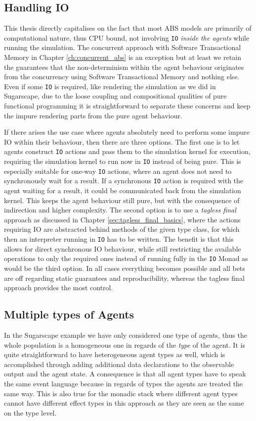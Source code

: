 \subsection{Handling IO}
This thesis directly capitalises on the fact that most ABS models are primarily of computational nature, thus CPU bound, not involving \texttt{IO} \textit{inside the agents} while running the simulation. The concurrent approach with Software Transactional Memory in Chapter \ref{ch:concurrent_abs} is an exception but at least we retain the guarantees that the non-determinism within the agent behaviour originates from the concurrency using Software Transactional Memory and nothing else. Even if some \texttt{IO} is required, like rendering the simulation as we did in Sugarscape, due to the loose coupling and compositional qualities of pure functional programming it is straightforward to separate these concerns and keep the impure rendering parts from the pure agent behaviour.

If there arises the use case where agents absolutely need to perform some impure IO within their behaviour, then there are three options. The first one is to let agents construct \texttt{IO} actions and pass them to the simulation kernel for execution, requiring the simulation kernel to run now in \texttt{IO} instead of being pure. This is especially suitable for one-way \texttt{IO} actions, where an agent does not need to synchronously wait for a result. If a synchronous \texttt{IO} action is required with the agent waiting for a result, it could be communicated back from the simulation kernel. This keeps the agent behaviour still pure, but with the consequence of indirection and higher complexity. The second option is to use a \textit{tagless final} approach as discussed in Chapter \ref{sec:tagless_final_basics}, where the actions requiring IO are abstracted behind methods of the given type class, for which then an interpreter running in \texttt{IO} has to be written. The benefit is that this allows for direct synchronous IO behaviour, while still restricting the available operations to only the required ones instead of running fully in the \texttt{IO} Monad as would be the third option. In all cases everything becomes possible and all bets are off regarding static guarantees and reproducibility, whereas the tagless final approach provides the most control.

\subsection{Multiple types of Agents}
In the Sugarscape example we have only considered one type of agents, thus the whole population is a homogeneous one in regards of the \textit{type} of the agent. It is quite straightforward to have heterogeneous agent types as well, which is accomplished through adding additional data declarations to the observable output and the agent state. A consequence is that all agent types have to speak the same event language because in regards of types the agents are treated the same way. This is also true for the monadic stack where different agent types cannot have different effect types in this approach as they are seen as the same on the type level.

